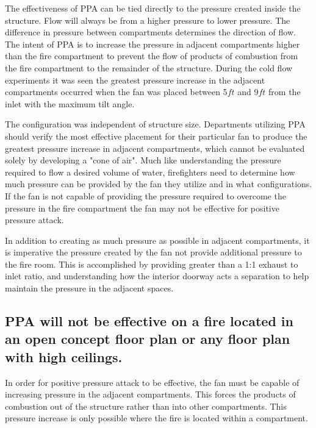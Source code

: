 \documentclass{article}
\begin{document}
The effectiveness of PPA can be tied directly to the pressure created inside the structure. Flow will always be from a higher pressure to lower pressure. The difference in pressure between compartments determines the direction of flow. The intent of PPA is to increase the pressure in adjacent compartments higher than the fire compartment to prevent the flow of products of combustion from the fire compartment to the remainder of the structure. During the cold flow experiments it was seen the greatest pressure increase in the adjacent compartments occurred when the fan was placed between 5$ft$ and 9$ft$ from the inlet with the maximum tilt angle.

The configuration was independent of structure size. Departments utilizing PPA should verify the most effective placement for their particular fan to produce the greatest pressure increase in adjacent compartments, which cannot be evaluated solely by developing a "cone of air". Much like understanding the pressure required to flow a desired volume of water, firefighters need to determine how much pressure can be provided by the fan they utilize and in what configurations. If the fan is not capable of providing the pressure required to overcome the pressure in the fire compartment the fan may not be effective for positive pressure attack. 

In addition to creating as much pressure as possible in adjacent compartments, it is imperative the pressure created by the fan not provide additional pressure to the fire room. This is accomplished by providing greater than a 1:1 exhaust to inlet ratio, and understanding how the interior doorway acts a separation to help maintain the pressure in the adjacent spaces.  

\subsection{PPA will not be effective on a fire located in an open concept floor plan or any floor plan with high ceilings.}
In order for positive pressure attack to be effective, the fan must be capable of increasing pressure in the adjacent compartments. This forces the products of combustion out of the structure rather than into other compartments. This pressure increase is only possible where the fire is located within a compartment. 
\end{document}
